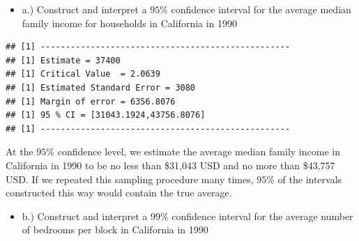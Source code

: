 \documentclass[
]{article}
\newenvironment{Shaded}{\begin{snugshade}}{\end{snugshade}}
\newcommand{\AttributeTok}[1]{\textcolor[rgb]{0.13,0.29,0.53}{#1}}
\newcommand{\CommentTok}[1]{\textcolor[rgb]{0.56,0.35,0.01}{\textit{#1}}}
\newcommand{\DecValTok}[1]{\textcolor[rgb]{0.00,0.00,0.81}{#1}}
\newcommand{\FloatTok}[1]{\textcolor[rgb]{0.00,0.00,0.81}{#1}}
\newcommand{\FunctionTok}[1]{\textcolor[rgb]{0.13,0.29,0.53}{\textbf{#1}}}
\newcommand{\NormalTok}[1]{#1}
\newcommand{\OtherTok}[1]{\textcolor[rgb]{0.56,0.35,0.01}{#1}}
\newcommand{\SpecialCharTok}[1]{\textcolor[rgb]{0.81,0.36,0.00}{\textbf{#1}}}
\providecommand{\tightlist}{%
  \setlength{\itemsep}{0pt}\setlength{\parskip}{0pt}}
\begin{document}
\begin{itemize}
\tightlist
\item
  a.) Construct and interpret a \(95\%\) confidence interval for the
  average median family income for households in California in 1990
\end{itemize}

\begin{Shaded}
\end{Shaded}

\begin{verbatim}
## [1] --------------------------------------------------
## [1] Estimate = 37400
## [1] Critical Value  = 2.0639
## [1] Estimated Standard Error = 3080
## [1] Margin of error = 6356.8076
## [1] 95 % CI = [31043.1924,43756.8076]
## [1] --------------------------------------------------
\end{verbatim}

{At the \(95\%\) confidence level, we estimate the average median family
income in California in 1990 to be no less than \$31,043 USD and no more
than \$43,757 USD. If we repeated this sampling procedure many times,
\(95\%\) of the intervals constructed this way would contain the true
average.}

\begin{itemize}
\tightlist
\item
  b.) Construct and interpret a \(99\%\) confidence interval for the
  average number of bedrooms per block in California in 1990
\end{itemize}
\end{document}
